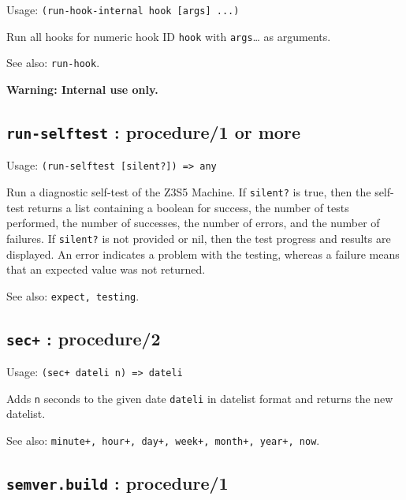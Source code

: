 \documentclass[
]{article}
\newcommand{\passthrough}[1]{#1}
\begin{document}
Usage: \passthrough{\lstinline!(run-hook-internal hook [args] ...)!}

Run all hooks for numeric hook ID \passthrough{\lstinline!hook!} with
\passthrough{\lstinline!args!}\ldots{} as arguments.

See also: \passthrough{\lstinline!run-hook!}.

\textbf{Warning: Internal use only.}

\hypertarget{run-selftest-procedure1-or-more-1}{%
\subsection{\texorpdfstring{\texttt{run-selftest} : procedure/1 or
more}{run-selftest : procedure/1 or more}}\label{run-selftest-procedure1-or-more-1}}

Usage: \passthrough{\lstinline!(run-selftest [silent?]) => any!}

Run a diagnostic self-test of the Z3S5 Machine. If
\passthrough{\lstinline!silent?!} is true, then the self-test returns a
list containing a boolean for success, the number of tests performed,
the number of successes, the number of errors, and the number of
failures. If \passthrough{\lstinline!silent?!} is not provided or nil,
then the test progress and results are displayed. An error indicates a
problem with the testing, whereas a failure means that an expected value
was not returned.

See also: \passthrough{\lstinline!expect, testing!}.

\hypertarget{sec-procedure2-1}{%
\subsection{\texorpdfstring{\texttt{sec+} :
procedure/2}{sec+ : procedure/2}}\label{sec-procedure2-1}}

Usage: \passthrough{\lstinline!(sec+ dateli n) => dateli!}

Adds \passthrough{\lstinline!n!} seconds to the given date
\passthrough{\lstinline!dateli!} in datelist format and returns the new
datelist.

See also:
\passthrough{\lstinline!minute+, hour+, day+, week+, month+, year+, now!}.

\hypertarget{semver.build-procedure1-1}{%
\subsection{\texorpdfstring{\texttt{semver.build} :
procedure/1}{semver.build : procedure/1}}\label{semver.build-procedure1-1}}
\end{document}

